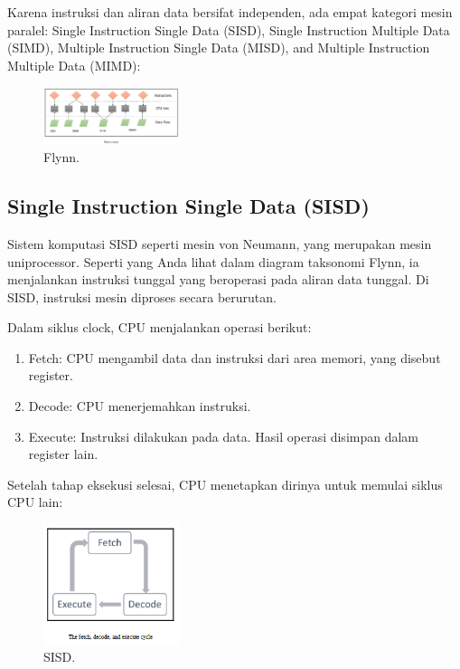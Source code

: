 \noindent
Karena instruksi dan aliran data bersifat independen, ada empat kategori mesin paralel: Single Instruction Single Data (SISD), Single Instruction Multiple Data (SIMD), Multiple Instruction Single Data (MISD), and Multiple Instruction Multiple Data (MIMD):

\begin{figure}[H]
	\includegraphics[width=4cm]{figures/kelompok2/chapter1/1.png}
	\centering
	\caption{Flynn.}
\end{figure}

\subsection{Single Instruction Single Data (SISD)}
Sistem komputasi SISD seperti mesin von Neumann, yang merupakan mesin uniprocessor. Seperti yang Anda lihat dalam diagram taksonomi Flynn, ia menjalankan instruksi tunggal yang beroperasi pada aliran data tunggal. Di SISD, instruksi mesin diproses secara berurutan.

\noindent
Dalam siklus clock, CPU menjalankan operasi berikut:

\begin{enumerate}
	\item Fetch: CPU mengambil data dan instruksi dari area memori, yang disebut register.
	\item Decode: CPU menerjemahkan instruksi.
	\item Execute: Instruksi dilakukan pada data. Hasil operasi disimpan dalam register lain.
\end{enumerate}

\noindent
Setelah tahap eksekusi selesai, CPU menetapkan dirinya untuk memulai siklus CPU lain:

\begin{figure}[H]
	\includegraphics[width=4cm]{figures/kelompok2/chapter1/2.png}
	\centering
	\caption{SISD.}
\end{figure}

